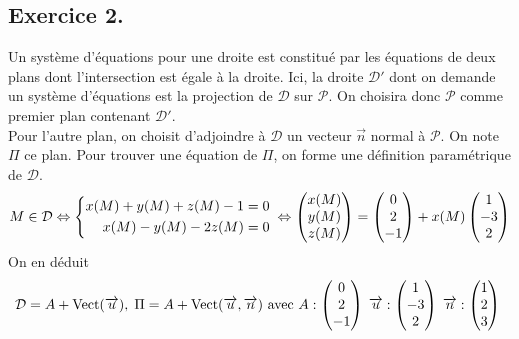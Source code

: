 \subsection*{Exercice 2.}
Un système d'équations pour une droite est constitué par les équations de deux plans dont l'intersection est égale à la droite. Ici, la droite $\mathcal{D}'$ dont on demande un système d'équations est la projection de $\mathcal{D}$ sur $\mathcal P$. On choisira donc $\mathcal{P}$ comme premier plan contenant $\mathcal D'$.\\
Pour l'autre plan, on choisit d'adjoindre à $\mathcal D$ un vecteur $\overrightarrow n$ normal à $\mathcal P$. On note $\Pi$ ce plan. Pour trouver une équation de $\Pi$, on forme une définition paramétrique de $\mathcal D$.
\begin{displaymath}
 M\in \mathcal{D}\Leftrightarrow
\left\lbrace 
\begin{aligned}
 x(M) + y(M) + z(M) -1 = 0 \\
 x(M) - y(M)-2z(M) = 0
\end{aligned}
\right. \\
\Leftrightarrow
\begin{pmatrix}
 x(M)\\y(M)\\z(M)
\end{pmatrix}
=
\begin{pmatrix}
 0\\2\\-1
\end{pmatrix}
+x(M)
\begin{pmatrix}
 1\\-3\\2
\end{pmatrix}
\end{displaymath}
On en déduit
\begin{displaymath}
\mathcal{D} = A+\operatorname{Vect}(\overrightarrow u),\; \Pi = A+\operatorname{Vect}(\overrightarrow u, \overrightarrow n)
\text{ avec }
A:
\begin{pmatrix}
 0\\2\\-1
\end{pmatrix}
\;
\overrightarrow u:
\begin{pmatrix}
 1\\-3\\2
\end{pmatrix}
\;
\overrightarrow n:
\begin{pmatrix}
 1\\2\\3
\end{pmatrix}
\;
\end{displaymath}
